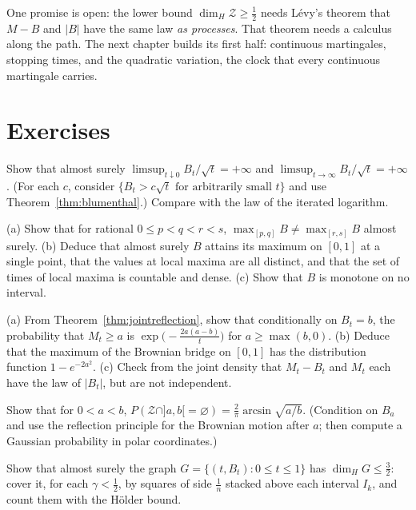 One promise is open: the lower bound $\dim_H\mathcal Z\ge\frac12$ needs L\'evy's theorem that $M-B$ and $|B|$ have the same law \emph{as processes}.
That theorem needs a calculus along the path. The next chapter builds its first half: continuous martingales, stopping times, and the quadratic
variation, the clock that every continuous martingale carries.

\section{Exercises}

\begin{exercise}[$\star$]\label{ex:limsupsqrt}
Show that almost surely $\limsup_{t\downarrow0}B_t/\sqrt t=+\infty$ and $\limsup_{t\to\infty}B_t/\sqrt t=+\infty$. (For each $c$, consider $\{B_t>c\sqrt t\text{ for arbitrarily small }t\}$ and use
Theorem~\ref{thm:blumenthal}.) Compare with the law of the iterated logarithm.
\end{exercise}

\begin{exercise}[$\star\star$]\label{ex:localmax}
(a) Show that for rational $0\le p<q<r<s$, $\max_{[p,q]}B\neq\max_{[r,s]}B$ almost surely. (b) Deduce that almost surely $B$ attains its maximum on $[0,1]$ at a single point, that the values at local maxima
are all distinct, and that the set of times of local maxima is countable and dense. (c) Show that $B$ is monotone on no interval.
\end{exercise}

\begin{exercise}[$\star\star$]\label{ex:bridgemax}
(a) From Theorem~\ref{thm:jointreflection}, show that conditionally on $B_t=b$, the probability that $M_t\ge a$ is $\exp\bigl(-\frac{2a(a-b)}t\bigr)$ for $a\ge\max(b,0)$. (b) Deduce that the maximum of the Brownian bridge
on $[0,1]$ has the distribution function $1-e^{-2a^2}$. (c) Check from the joint density that $M_t-B_t$ and $M_t$ each have the law of $|B_t|$, but are not independent.
\end{exercise}

\begin{exercise}[$\star\star$]\label{ex:nozero}
Show that for $0<a<b$, $P(\mathcal Z\cap]a,b[=\varnothing)=\frac2\pi\arcsin\sqrt{a/b}$. (Condition on $B_a$ and use the reflection principle for the Brownian motion after $a$; then compute a Gaussian probability in polar
coordinates.)
\end{exercise}

\begin{exercise}[$\star\star$]\label{ex:graph}
Show that almost surely the graph $G=\{(t,B_t):0\le t\le1\}$ has $\dim_HG\le\frac32$: cover it, for each $\gamma<\frac12$, by squares of side $\frac1n$ stacked above each interval $I_k$, and count them with the H\"older bound.
\end{exercise}

